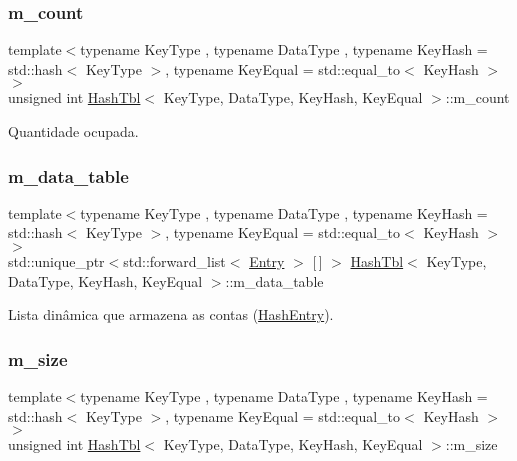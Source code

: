 \mbox{\label{classHashTbl_a2ecc779b66589db1ed8167fe9b81a6c9}} 
\subsubsection{\texorpdfstring{m\+\_\+count}{m\_count}}
{\footnotesize\ttfamily template$<$typename Key\+Type , typename Data\+Type , typename Key\+Hash  = std\+::hash$<$ Key\+Type $>$, typename Key\+Equal  = std\+::equal\+\_\+to$<$ Key\+Hash $>$$>$ \\
unsigned int \hyperlink{classHashTbl}{Hash\+Tbl}$<$ Key\+Type, Data\+Type, Key\+Hash, Key\+Equal $>$\+::m\+\_\+count\hspace{0.3cm}{\ttfamily [private]}}



Quantidade ocupada. 

\mbox{\label{classHashTbl_af4bbcaeab668db62a8ca1d353377a4a4}} 
\subsubsection{\texorpdfstring{m\+\_\+data\+\_\+table}{m\_data\_table}}
{\footnotesize\ttfamily template$<$typename Key\+Type , typename Data\+Type , typename Key\+Hash  = std\+::hash$<$ Key\+Type $>$, typename Key\+Equal  = std\+::equal\+\_\+to$<$ Key\+Hash $>$$>$ \\
std\+::unique\+\_\+ptr$<$std\+::forward\+\_\+list$<$ \hyperlink{classHashTbl_ab9ca4e5818aa21557c7cedaf02a1e7db}{Entry} $>$ \mbox{[}$\,$\mbox{]} $>$ \hyperlink{classHashTbl}{Hash\+Tbl}$<$ Key\+Type, Data\+Type, Key\+Hash, Key\+Equal $>$\+::m\+\_\+data\+\_\+table\hspace{0.3cm}{\ttfamily [private]}}



Lista dinâmica que armazena as contas (\hyperlink{classHashEntry}{Hash\+Entry}). 

\mbox{\label{classHashTbl_acb5d99413eab0f528c43c01186ac7276}} 
\subsubsection{\texorpdfstring{m\+\_\+size}{m\_size}}
{\footnotesize\ttfamily template$<$typename Key\+Type , typename Data\+Type , typename Key\+Hash  = std\+::hash$<$ Key\+Type $>$, typename Key\+Equal  = std\+::equal\+\_\+to$<$ Key\+Hash $>$$>$ \\
unsigned int \hyperlink{classHashTbl}{Hash\+Tbl}$<$ Key\+Type, Data\+Type, Key\+Hash, Key\+Equal $>$\+::m\+\_\+size\hspace{0.3cm}{\ttfamily [private]}}



